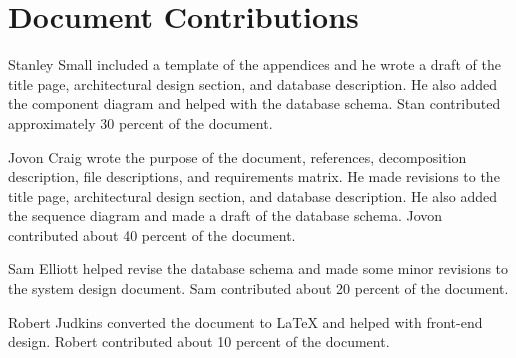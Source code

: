 \documentclass{article}
\begin{document}
\newpage
\section{Document Contributions}

Stanley Small included a template of the appendices and he wrote a draft of the title page, architectural design section, and database description. He also added the component diagram and helped with the database schema. Stan contributed approximately 30 percent of the document.

Jovon Craig wrote the purpose of the document, references, decomposition description, file descriptions, and requirements matrix. He made revisions to the title page, architectural design section, and database description. He also added the sequence diagram and made a draft of the database schema. Jovon contributed about 40 percent of the document.

Sam Elliott helped revise the database schema and made some minor revisions to the system design document. Sam contributed about 20 percent of the document.

Robert Judkins converted the document to LaTeX and helped with front-end design. Robert contributed about 10 percent of the document.
\end{document}
